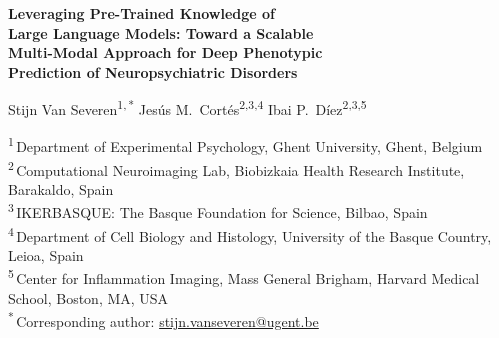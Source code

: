 \documentclass[11pt,a4paper,twoside]{article}
\begin{document}
\thispagestyle{plain}

\begin{center}
\vspace*{0.5cm}
\begin{singlespacing}
{\LARGE\bfseries Leveraging Pre-Trained Knowledge of\\
Large Language Models: Toward a Scalable\\
Multi-Modal Approach for Deep Phenotypic\\[6pt]
Prediction of Neuropsychiatric Disorders}
\end{singlespacing}

\vspace{20pt}

{\large
Stijn Van Severen\textsuperscript{1,\,*} \quad
Jes\'{u}s M.\ Cort\'{e}s\textsuperscript{2,3,4} \quad
Ibai P.\ D\'{i}ez\textsuperscript{2,3,5}}

\vspace{10pt}

{\small
\textsuperscript{1}\,Department of Experimental Psychology, Ghent University, Ghent, Belgium\\[2pt]
\textsuperscript{2}\,Computational Neuroimaging Lab, Biobizkaia Health Research Institute, Barakaldo, Spain\\[2pt]
\textsuperscript{3}\,IKERBASQUE: The Basque Foundation for Science, Bilbao, Spain\\[2pt]
\textsuperscript{4}\,Department of Cell Biology and Histology, University of the Basque Country, Leioa, Spain\\[2pt]
\textsuperscript{5}\,Center for Inflammation Imaging, Mass General Brigham, Harvard Medical School, Boston, MA, USA\\[6pt]
\textsuperscript{*}\,Corresponding author: \href{mailto:stijn.vanseveren@ugent.be}{stijn.vanseveren@ugent.be}}
\end{center}

\vspace{16pt}
\end{document}

